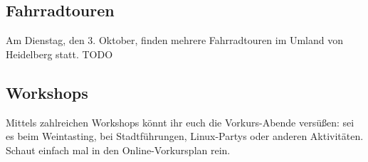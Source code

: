 \subsection{Fahrradtouren}
Am Dienstag, den 3. Oktober, finden mehrere Fahrradtouren im Umland von Heidelberg statt. TODO

\subsection{Workshops}
Mittels zahlreichen Workshops könnt ihr euch die Vorkurs-Abende versüßen: sei es beim Weintasting, bei Stadtführungen, Linux-Partys oder anderen Aktivitäten. Schaut einfach mal in den Online-Vorkursplan rein.
